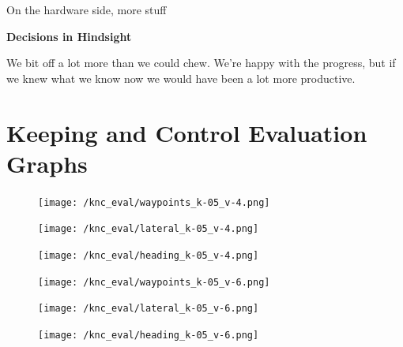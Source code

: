 \documentclass[titlepage,draft]{article}
\begin{document}
{On the hardware side, more stuff

\textbf{Decisions in Hindsight}

We bit off a lot more than we could chew. We're happy with the progress, but if we knew what we know now we would have been a lot more productive.

\vspace{12pt}

\appendix

\section{Keeping and Control Evaluation Graphs}
\label{FirstAppendix}

\begin{figure}[H]
	\centering
	\begin{minipage}{.45\textwidth}
		\centering
		\texttt{[image: /knc\_eval/waypoints\_k-05\_v-4.png]}
		\label{fig:wayk5v4}
	\end{minipage}%
	\hspace{0.1\textwidth}%
	\begin{minipage}{.45\textwidth}
		\centering
		\texttt{[image: /knc\_eval/lateral\_k-05\_v-4.png]}
		\label{fig:latk5v4}
	\end{minipage}
\end{figure}

\begin{figure}[H]
	\centering
	\begin{minipage}{.45\textwidth}
		\centering
		\texttt{[image: /knc\_eval/heading\_k-05\_v-4.png]}
		\label{fig:headk5v4}
	\end{minipage}%
	\hspace{0.1\textwidth}%
	\begin{minipage}{.45\textwidth}
		\centering
		\texttt{[image: /knc\_eval/waypoints\_k-05\_v-6.png]}
		\label{fig:wayk5v6}
	\end{minipage}
\end{figure}

\begin{figure}[H]
	\centering
	\begin{minipage}{.45\textwidth}
		\centering
		\texttt{[image: /knc\_eval/lateral\_k-05\_v-6.png]}
		\label{fig:latk5v6}
	\end{minipage}%
	\hspace{0.1\textwidth}%
	\begin{minipage}{.45\textwidth}
		\centering
		\texttt{[image: /knc\_eval/heading\_k-05\_v-6.png]}
		\label{fig:headk5v6}
	\end{minipage}
\end{figure}

}
\end{document}
